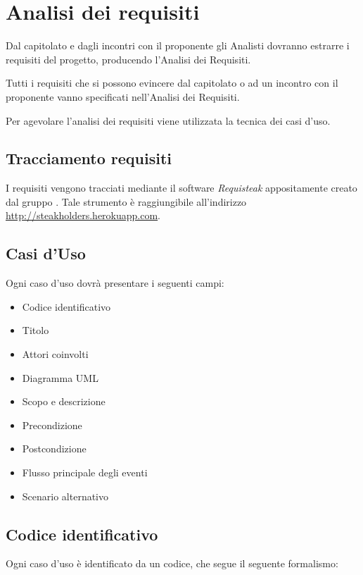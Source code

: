 \section{Analisi dei requisiti}

Dal capitolato e dagli incontri con il proponente gli Analisti dovranno estrarre i requisiti del progetto, producendo l'Analisi dei Requisiti.

Tutti i requisiti che si possono evincere dal capitolato o ad un incontro con il proponente vanno specificati nell'Analisi dei Requisiti.

Per agevolare l'analisi dei requisiti viene utilizzata la tecnica dei casi d'uso.

	\subsection{Tracciamento requisiti}
	 I requisiti vengono tracciati mediante il software \emph{Requisteak} appositamente creato dal gruppo \GroupName{}. Tale strumento è raggiungibile all'indirizzo \url{http://steakholders.herokuapp.com}.
	 
\subsection{Casi d'Uso}

Ogni caso d'uso dovrà presentare i seguenti campi:
\begin{itemize}
 \item Codice identificativo
 \item Titolo
 \item Attori coinvolti
 \item Diagramma UML
 \item Scopo e descrizione
 \item Precondizione
 \item Postcondizione
 \item Flusso principale degli eventi
 \item Scenario alternativo
\end{itemize}

\subsection{Codice identificativo}

Ogni caso d'uso è identificato da un codice, che segue il seguente formalismo:
\begin{center}
\end{center}

